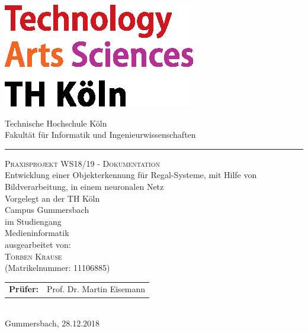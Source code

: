 \documentclass[a4paper,12pt,oneside]{article}
\begin{document}
  
  \pagestyle{empty}
  \begin{titlepage}
    \includegraphics[scale=1.00]{Sources/logo_TH-Koeln_CMYK_22pt}\\
    \begin{center}
      \Large
      Technische Hochschule Köln\\
      Fakultät für Informatik und Ingenieurwissenschaften\\
      \hrule\par\rule{0pt}{2cm} %
      \LARGE
      \textsc{Praxisprojekt WS18/19 - Dokumentation}\\
      \vspace{1cm} %
      \huge
      Entwicklung einer Objekterkennung für Regal-Systeme,
      mit Hilfe von Bildverarbeitung, in einem neuronalen Netz\\
      \vspace{1 cm}
      \large
      Vorgelegt an der TH Köln\\
      Campus Gummersbach\\
      im Studiengang\\
      Medieninformatik\\ 
      \vspace{1.0cm}
      ausgearbeitet von:\\
      \textsc{Torben Krause}\\
      (Matrikelnummer: 11106885)\\
      \vspace{1.5cm}
      \begin{tabular}{ll} %
          \textbf{Prüfer:} & Prof. Dr. Martin Eisemann \\
      \end{tabular}
      \vspace{1.5cm}
      \\Gummersbach, 28.12.2018
    \end{center}    
  \end{titlepage}
  
\end{document}

